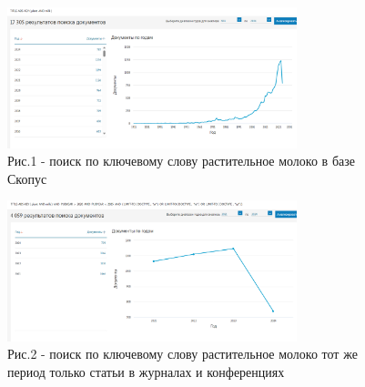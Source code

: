 \begin{figure}[H]
	\centering
	\includegraphics[width=0.75\textwidth]{media/pish/image47}
	\caption*{Рис.1 - поиск по ключевому слову растительное молоко в базе Скопус}
\end{figure}

\begin{figure}[H]
	\centering
	\includegraphics[width=0.75\textwidth]{media/pish/image48}
	\caption*{Рис.2 - поиск по ключевому слову растительное молоко тот же период только статьи в журналах и конференциях}
\end{figure}

